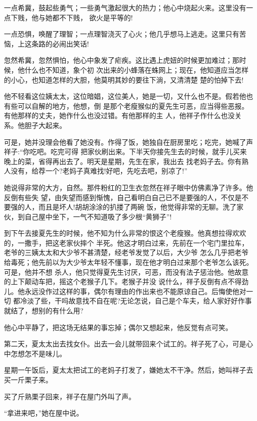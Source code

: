 \documentclass[11pt,a4paper,onecolumn]{article}
\begin{document}
一点希冀，鼓起些勇气；一些勇气激起很大的热力；他心中烧起火来。这里没有一点下贱，他与她都不下贱，
欲火是平等的!

一点恐惧，唤醒了理智；一点理智浇灭了心火；他几乎想马上逃走。这里只有苦恼，上这条路的必闹出笑话!

忽然希冀，忽然惧怕，他心中象发了疟疾。这比遇上虎妞的时候更加难过；那时候，他什么也不知道，象个初
次出来的小蜂落在蛛网上；现在，他知道应当怎样的小心，也知道怎样的大胆，他莫明其妙的要往下淌，又清清楚
楚的怕掉下去!

他不轻看这位姨太太，这位暗娼，这位美人，她是一切，又什么也不是。假若他也有些可以自解的地方，他想，倒
是那个老瘦猴似的夏先生可恶，应当得些恶报。有他那样的丈夫，她作什么也没过错。有他那样的主
人，他\myrule 祥子\myrule 作什么也没关系。他胆子大起来。

可是，她并没理会他看了她没有。作得了饭，她独自在厨房里吃；吃完，她喊了声祥子:``你吃吧。吃完可得
把家伙刷出来。下半天你接先生去的时候，就手儿买来晚上的菜，省得再出去了。明天是星期，先生在家，我出去
找老妈子去。你有熟人没有，给荐一个?老妈子真难找!好吧，先吃去吧，别凉了!''

她说得非常的大方，自然。那件粉红的卫生衣忽然\myrule 在祥子眼中\myrule 仿佛素净了许多。他反倒有些失
望，由失望而感到惭愧，自己看明白自己已不是要强的人，不仅是不要强的人，而且是坏人!胡胡涂涂的扒搂了两碗
饭，他觉得非常的无聊。洗了家伙，到自己屋中坐下，一气不知道吸了多少根``黄狮子''!

到下午去接夏先生的时候，他不知为什么非常的恨这个老瘦猴。他真想拉得欢欢的，一撒手，把这老家伙摔个
半死。他这才明白过来，先前在一个宅门里拉车，老爷的三姨太太和大少爷不甚清楚，经老爷发觉了以后，大少爷
怎么几乎把老爷给毒死；他先前以为大少爷太年轻不懂事，现在他才明白过来那个老爷怎么该死。可是，他并不想
杀人，他只觉得夏先生讨厌，可恶，而没有法子惩治他。他故意的上下颠动车把，摇这个老猴子几下。老猴子并没
说什么，祥子反倒有点不得劲儿。他永远没作过这样的事，偶尔有理由的作出来也不能原谅自己。后悔使他对一切
都冷淡了些，干吗故意找不自在呢?无论怎说，自己是个车夫，给人家好好作事就结了，想别的有什么用?

他心中平静了，把这场无结果的事忘掉；偶尔又想起来，他反觉有点可笑。

第二天，夏太太出去找女仆。出去一会儿就带回来个试工的。祥子死了心，可是心中怎想怎不是味儿。

星期一午饭后，夏太太把试工的老妈子打发了，嫌她太不干净。然后，她叫祥子去买一斤栗子来。

买了斤熟栗子回来，祥子在屋门外叫了声。

``拿进来吧，''她在屋中说。
\end{document}
